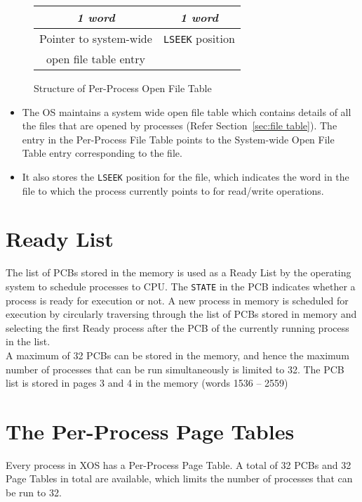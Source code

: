 \documentclass[10pt]{report}
\begin{document}
		\begin{figure}[htp!]
		\centering
		\begin{tabular}{|c|c|}
			\textit{1 word} & \textit{1 word} \\
			\hline
			Pointer to system-wide & \texttt{LSEEK} position\\ open file table entry &  \\
			\hline
		\end{tabular}
		\caption{Structure of Per-Process Open File Table}
		\label{fig:processfile table}
	\end{figure}
\begin{itemize}
\item
The OS maintains a system wide open file table which contains details of all the files that are opened by processes (Refer Section~\ref{sec:file table}). The entry in the Per-Process File Table points to the System-wide Open File Table entry corresponding to the file. 
\item It also stores the \texttt{LSEEK} position for the file, which indicates the word in the file to which the process currently points to for read/write operations. 
\end{itemize}




\section{Ready List}
\label{sec:readylist}

The list of PCBs stored in the memory is used as a Ready List by the operating system to schedule processes to CPU. The \texttt{STATE} in the PCB indicates whether a process is ready for execution or not.  A new process in memory is scheduled for execution by circularly traversing through the list of PCBs stored in memory and selecting the first Ready process after the PCB of the currently running process in the list.\\

A maximum of 32 PCBs can be stored in the memory, and hence the maximum number of processes that can be run simultaneously is limited to 32. The PCB list is stored in pages 3 and 4 in the memory (words 1536 -- 2559)

\section{The Per-Process Page Tables}
\label{sec:pagetable}
Every process in XOS has a Per-Process Page Table. A total of 32 PCBs and 32 Page Tables in total are available, which limits the number of processes that can be run to 32. \\
\end{document}
